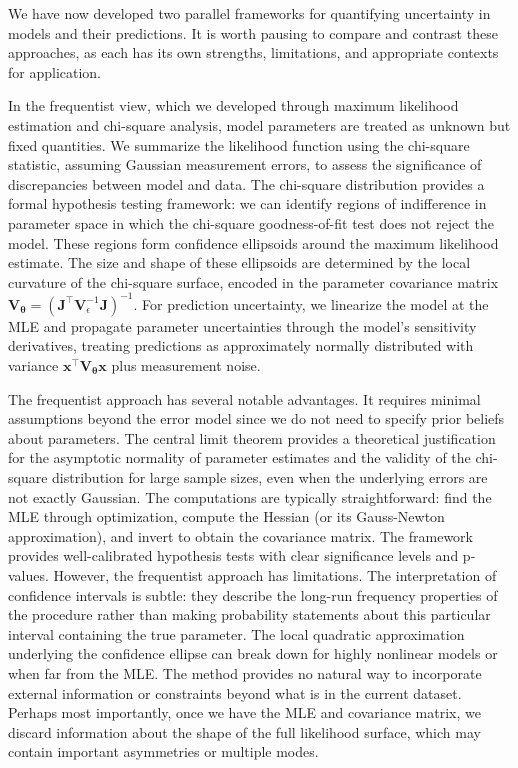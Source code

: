We have now developed two parallel frameworks for quantifying uncertainty in models and their predictions. It is worth pausing to compare and contrast these approaches, as each has its own strengths, limitations, and appropriate contexts for application.

In the frequentist view, which we developed through maximum likelihood estimation and chi-square analysis, model parameters are treated as unknown but fixed quantities. We summarize the likelihood function using the chi-square statistic, assuming Gaussian measurement errors, to assess the significance of discrepancies between model and data. The chi-square distribution provides a formal hypothesis testing framework: we can identify regions of indifference in parameter space in which the chi-square goodness-of-fit test does not reject the model. These regions form confidence ellipsoids around the maximum likelihood estimate. The size and shape of these ellipsoids are determined by the local curvature of the chi-square surface, encoded in the parameter covariance matrix $\mathbf{V}_{\boldsymbol{\theta}} = (\mathbf{J}^\top\mathbf{V}_{\epsilon}^{-1}\mathbf{J})^{-1}$. For prediction uncertainty, we linearize the model at the MLE and propagate parameter uncertainties through the model's sensitivity derivatives, treating predictions as approximately normally distributed with variance $\mathbf{x}^\top\mathbf{V}_{\boldsymbol{\theta}}\mathbf{x}$ plus measurement noise.

The frequentist approach has several notable advantages. It requires minimal assumptions beyond the error model since we do not need to specify prior beliefs about parameters. The central limit theorem provides a theoretical justification for the asymptotic normality of parameter estimates and the validity of the chi-square distribution for large sample sizes, even when the underlying errors are not exactly Gaussian. The computations are typically straightforward: find the MLE through optimization, compute the Hessian (or its Gauss-Newton approximation), and invert to obtain the covariance matrix. The framework provides well-calibrated hypothesis tests with clear significance levels and p-values. However, the frequentist approach has limitations. The interpretation of confidence intervals is subtle: they describe the long-run frequency properties of the procedure rather than making probability statements about this particular interval containing the true parameter. The local quadratic approximation underlying the confidence ellipse can break down for highly nonlinear models or when far from the MLE. The method provides no natural way to incorporate external information or constraints beyond what is in the current dataset. Perhaps most importantly, once we have the MLE and covariance matrix, we discard information about the shape of the full likelihood surface, which may contain important asymmetries or multiple modes.

